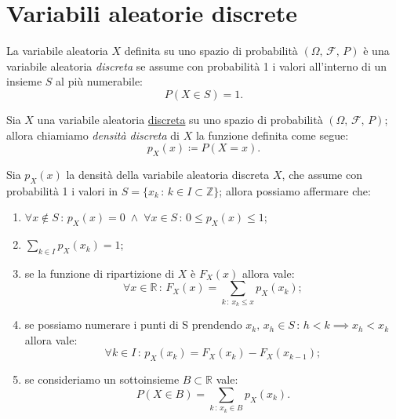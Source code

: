     \section{Variabili aleatorie discrete}
    \begin{defn}\label{defn:Variabili_aleatorie_discrete}
            La variabile aleatoria $X$ definita su uno spazio di probabilità $(\Omega,\,\mathscr{F},\,P)$ è una variabile aleatoria \emph{discreta} se assume con probabilità 1 i valori all'interno di un insieme $S$ al più numerabile: \[
                P(X \in S) = 1
            .\] 
        \end{defn}
        \begin{defn}\label{defn:Densità_discreta}
            Sia $X$ una variabile aleatoria \underline{discreta} su uno spazio di probabilità $(\Omega,\,\mathscr{F},\,P)$; allora chiamiamo \emph{densità discreta} di $X$ la funzione definita come segue: \[
                p_X(x) \coloneqq P(X = x)
            .\]
        \end{defn}
        \begin{prty}\label{prty:Densità_discreta}
            Sia  $p_X(x)$ la densità della variabile aleatoria discreta $X$, che assume con probabilità 1 i valori in $S = \{x_k \,:\, k \in I \subset \mathbb{Z}\}$; allora possiamo affermare che:
            \begin{enumerate}
                \item $\forall x \notin S \,:\, p_X(x) = 0 \;\land\; \forall x \in S \,:\, 0 \leq p_X(x) \leq 1$;
                \item $\sum_{k \in I} p_X(x_k) = 1$;
                \item se la funzione di ripartizione di $X$ è $F_X(x)$ allora vale:  \[
                    \forall x \in \mathbb{R} \,:\, F_X(x) = \sum_{k\,:\,x_k \leq x} p_X(x_k)
                ;\]
                \item se possiamo numerare i punti di S prendendo $x_k,\,x_h \in S \,:\, h < k \implies x_h < x_k$ allora vale: \[
                    \forall k \in I \,:\, p_X(x_k) = F_X(x_k) - F_X(x_{k-1})
                ;\]
                \item se consideriamo un sottoinsieme $B \subset \mathbb{R}$ vale: \[
                    P(X \in B) = \sum_{k \,:\, x_k \in B} p_X(x_k)
                .\]
            \end{enumerate}
        \end{prty}
